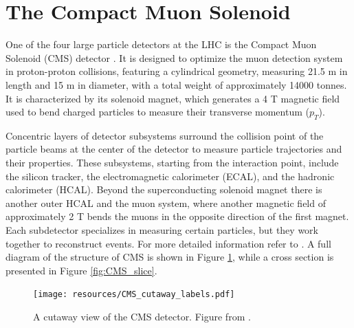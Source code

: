 \section{The Compact Muon Solenoid}

One of the four large particle detectors at the LHC is the Compact Muon Solenoid (CMS) detector \cite{CMS:1994hea, CMS:2008xjf}. It is designed to optimize the muon detection system in proton-proton collisions, featuring a cylindrical geometry, measuring 21.5 m in length and 15 m in diameter, with a total weight of approximately 14000 tonnes. It is characterized by its solenoid magnet, which generates a 4 T magnetic field used to bend charged particles to measure their transverse momentum ($p_T$).

Concentric layers of detector subsystems surround the collision point of the particle beams at the center of the detector to measure particle trajectories and their properties. These subsystems, starting from the interaction point, include the silicon tracker, the electromagnetic calorimeter (ECAL), and the hadronic calorimeter (HCAL). Beyond the superconducting solenoid magnet there is another outer HCAL and the muon system, where another magnetic field of approximately 2 T bends the muons in the opposite direction of the first magnet. Each subdetector specializes in measuring certain particles, but they work together to reconstruct events. For more detailed information refer to \cite{CMS:2006myw}. A full diagram of the structure of CMS is shown in Figure \ref{fig:CMS_cutaway}, while a cross section is presented in Figure \ref{fig:CMS_slice}.

\begin{figure}[!ht]
    \vspace*{-0.0cm}
    \centering
    \setlength{\mylength}{\textwidth}
    \texttt{[image: resources/CMS\_cutaway\_labels.pdf]}
    \vspace*{-0.0cm}
    \caption{A cutaway view of the CMS detector. Figure from \cite{Sakuma:2013jqa}.}
    \label{fig:CMS_cutaway}
    \vspace*{-0.3cm}
\end{figure}

